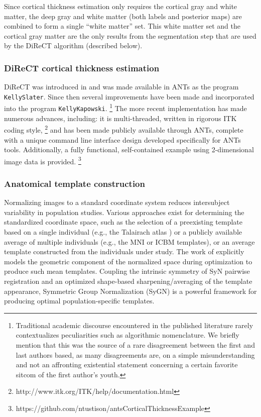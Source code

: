 Since cortical thickness estimation only requires the cortical gray
and white matter, the deep gray and white matter
(both labels and posterior maps) are combined to form a single
``white matter'' set.  This white matter set and the cortical
gray matter are the only results from the segmentation
step that are used by the DiReCT algorithm (described below).


\subsubsection{DiReCT cortical thickness estimation}

DiReCT was introduced 
in \cite{das2009} and was made available in ANTs as the program \verb#KellySlater#.
Since then several improvements have been made and incorporated into the program
\verb#KellyKapowski#.%
\footnote{
Traditional academic discourse encountered in the published literature
rarely contextualizes peculiarities such as algorithmic nomenclature.
We briefly mention that
this was the source of a rare disagreement between the first and last authors
based, as many disagreements are, on a simple misunderstanding and not an
affronting existential statement concerning a certain favorite sitcom
of the first author's youth. 
}
The more recent implementation has made numerous advances, including:
it is multi-threaded, written in rigorous ITK coding style,%
\footnote{
http://www.itk.org/ITK/help/documentation.html
}
 and
has been made publicly available through ANTs, complete with a unique command line
interface design developed specifically for ANTs tools.
Additionally, a fully functional, self-contained example using 2-dimensional image data is 
provided.
\footnote{
https://github.com/ntustison/antsCorticalThicknessExample
}

\subsubsection{Anatomical template construction}

Normalizing images to a standard coordinate system
reduces intersubject variability in population studies.  Various
approaches exist for determining the standardized coordinate space,
such as the selection of a preexisting template based on a single individual
(e.g., the Talairach atlas \citep{Talairach1988}) or a publicly available average of multiple individuals
(e.g., the MNI \citep{Collins1994} or ICBM \citep{Mazziotta1995}
templates), or an average template constructed from the individuals under study.
The work of \cite{avants2010} explicitly models the geometric component of the 
normalized space during optimization to produce such mean templates.  Coupling the intrinsic symmetry of 
SyN pairwise registration \citep{avants2011} and an
optimized shape-based sharpening/averaging of the template appearance, Symmetric Group Normalization (SyGN) is a powerful framework for producing optimal population-specific templates.

